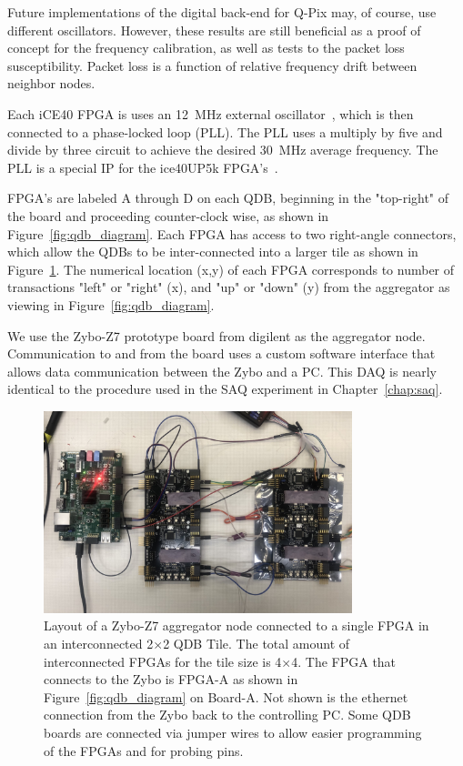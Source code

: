 Future implementations of the digital back-end for Q-Pix may, of course, use different oscillators.
However, these results are still beneficial as a proof of concept for the frequency calibration, as well as tests to the packet loss susceptibility.
Packet loss is a function of relative frequency drift between neighbor nodes.

Each iCE40 FPGA is uses an 12~\unit{MHz} external oscillator~\citep{ecs1612mv}, which is then connected to a phase-locked loop (PLL).
The PLL uses a multiply by five and divide by three circuit to achieve the desired 30~\unit{MHz} average frequency.
The PLL is a special IP for the ice40UP5k FPGA's~\citep{latticeice40up}.

FPGA's are labeled A through D on each QDB, beginning in the "top-right" of the board and proceeding counter-clock wise, as shown in Figure~\ref{fig:qdb_diagram}.
Each FPGA has access to two right-angle connectors, which allow the QDBs to be inter-connected into a larger tile as shown in Figure~\ref{fig:qdb_test_setup}.
The numerical location (x,y) of each FPGA corresponds to number of transactions "left" or "right" (x), and "up" or "down" (y) from the aggregator as viewing in Figure~\ref{fig:qdb_diagram}.

We use the Zybo-Z7 prototype board from digilent as the aggregator node.
Communication to and from the board uses a custom software interface that allows data communication between the Zybo and a PC.
This DAQ is nearly identical to the procedure used in the SAQ experiment in Chapter~\ref{chap:saq}.

\begin{figure}[]
\centering
\includegraphics[width=0.8\textwidth]{./images/qdb_frequency_test_setup.jpg}
\caption{Layout of a Zybo-Z7 aggregator node connected to a single FPGA in an interconnected 2$\times$2 QDB Tile.
The total amount of interconnected FPGAs for the tile size is 4$\times$4.
The FPGA that connects to the Zybo is FPGA-A as shown in Figure~\ref{fig:qdb_diagram} on Board-A.
Not shown is the ethernet connection from the Zybo back to the controlling PC.
Some QDB boards are connected via jumper wires to allow easier programming of the FPGAs and for probing pins.
}
\label{fig:qdb_test_setup}
\end{figure}

